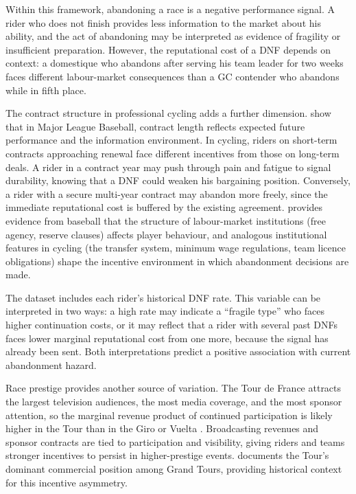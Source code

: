 Within this framework, abandoning a race is a negative performance signal. A rider who does not finish provides less information to the market about his ability, and the act of abandoning may be interpreted as evidence of fragility or insufficient preparation. However, the reputational cost of a DNF depends on context: a domestique who abandons after serving his team leader for two weeks faces different labour-market consequences than a GC contender who abandons while in fifth place.

The contract structure in professional cycling adds a further dimension. \textcite{krautmann2002contracts} show that in Major League Baseball, contract length reflects expected future performance and the information environment. In cycling, riders on short-term contracts approaching renewal face different incentives from those on long-term deals. A rider in a contract year may push through pain and fatigue to signal durability, knowing that a DNF could weaken his bargaining position. Conversely, a rider with a secure multi-year contract may abandon more freely, since the immediate reputational cost is buffered by the existing agreement. \textcite{kahn1993freeagency} provides evidence from baseball that the structure of labour-market institutions (free agency, reserve clauses) affects player behaviour, and analogous institutional features in cycling (the transfer system, minimum wage regulations, team licence obligations) shape the incentive environment in which abandonment decisions are made.

The dataset includes each rider's historical DNF rate. This variable can be interpreted in two ways: a high rate may indicate a ``fragile type'' who faces higher continuation costs, or it may reflect that a rider with several past DNFs faces lower marginal reputational cost from one more, because the signal has already been sent. Both interpretations predict a positive association with current abandonment hazard.

Race prestige provides another source of variation. The Tour de France attracts the largest television audiences, the most media coverage, and the most sponsor attention, so the marginal revenue product of continued participation is likely higher in the Tour than in the Giro or Vuelta \parencite{blair2012sports}. Broadcasting revenues and sponsor contracts are tied to participation and visibility, giving riders and teams stronger incentives to persist in higher-prestige events. \textcite{mignot2016cycling} documents the Tour's dominant commercial position among Grand Tours, providing historical context for this incentive asymmetry.

